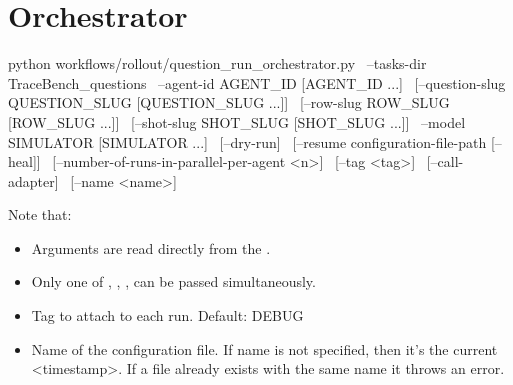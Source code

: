 \documentclass[11pt]{article}
\begin{document}
\section*{Orchestrator}
\begin{DocCode}
python workflows/rollout/question_run_orchestrator.py \
  --tasks-dir TraceBench_questions \
  --agent-id AGENT_ID [AGENT_ID ...] \
  [--question-slug QUESTION_SLUG [QUESTION_SLUG ...]] \
  [--row-slug ROW_SLUG [ROW_SLUG ...]] \
  [--shot-slug SHOT_SLUG [SHOT_SLUG ...]] \
  --model SIMULATOR [SIMULATOR ...] \
  [--dry-run] \
  [--resume configuration-file-path [--heal]] \
  [--number-of-runs-in-parallel-per-agent <n>] \
  [--tag <tag>] \ 
  [--call-adapter] \
  [--name <name>]
\end{DocCode}
Note that:
\begin{itemize}
  \item {}
  Arguments are read directly from the .
  \item Only one of , ,  ,  can be passed simultaneously.
  \item {} Tag to attach to each run. Default: DEBUG
  \item \code{--name} Name of the configuration file. If name is not specified, then it's the current <timestamp>. If a file already exists with the same name it throws an error.
\end{itemize}
\end{document}
